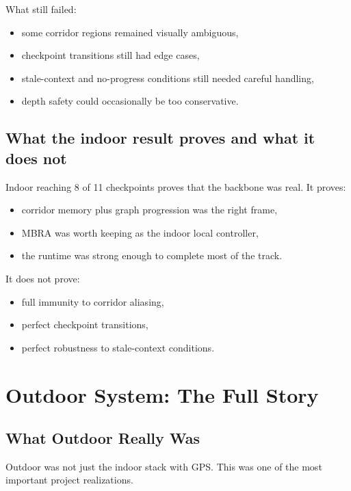 \documentclass[11pt]{article}
\begin{document}
What still failed:

\begin{itemize}[nosep]
  \item some corridor regions remained visually ambiguous,
  \item checkpoint transitions still had edge cases,
  \item stale-context and no-progress conditions still needed careful handling,
  \item depth safety could occasionally be too conservative.
\end{itemize}

\subsection{What the indoor result proves and what it does not}

Indoor reaching 8 of 11 checkpoints proves that the backbone was real. It proves:

\begin{itemize}[nosep]
  \item corridor memory plus graph progression was the right frame,
  \item MBRA was worth keeping as the indoor local controller,
  \item the runtime was strong enough to complete most of the track.
\end{itemize}

It does not prove:

\begin{itemize}[nosep]
  \item full immunity to corridor aliasing,
  \item perfect checkpoint transitions,
  \item perfect robustness to stale-context conditions.
\end{itemize}

\section{Outdoor System: The Full Story}

\subsection{What Outdoor Really Was}

Outdoor was not just the indoor stack with GPS. This was one of the most important
project realizations.
\end{document}
